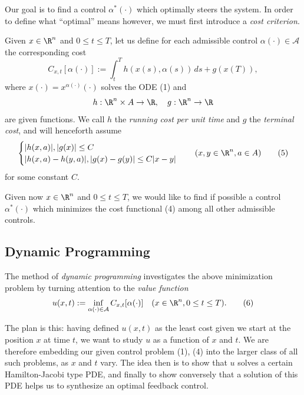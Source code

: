 Our goal is to find a control $\alpha^*(\cdot)$ which optimally steers the system. In order to define what ``optimal'' means however, we must first introduce a \textit{cost criterion}.

\begin{definition}
\label{def:control-cost-functional}
Given $x \in \R^n$ and $0 \le t \le T$, let us define for each admissible control $\alpha(\cdot) \in \mathcal{A}$ the corresponding cost
\[
C_{x,t}[\alpha(\cdot)] := \int_t^T h(x(s), \alpha(s)) \, ds + g(x(T)),
\tag{4}
\]
where $x(\cdot) = x^{\alpha(\cdot)}(\cdot)$ solves the ODE (1) and
\[
h : \R^n \times A \to \R, \quad g : \R^n \to \R
\]
are given functions. We call $h$ the \textit{running cost per unit time} and $g$ the \textit{terminal cost}, and will henceforth assume
\[
\begin{cases} |h(x, a)|, |g(x)| \le C \\ |h(x, a) - h(y, a)|, |g(x) - g(y)| \le C|x - y| \end{cases} \quad (x, y \in \R^n, a \in A)
\tag{5}
\]
for some constant $C$.

Given now $x \in \R^n$ and $0 \le t \le T$, we would like to find if possible a control $\alpha^*(\cdot)$ which minimizes the cost functional (4) among all other admissible controls.
\end{definition}

\subsection{Dynamic Programming}

\begin{definition}
\label{def:value-function}
The method of \textit{dynamic programming} investigates the above minimization problem by turning attention to the \textit{value function}
\[
u(x,t) := \inf_{\alpha(\cdot) \in \mathcal{A}} C_{x,t}[\alpha(\cdot)] \quad (x \in \R^n, 0 \le t \le T).
\tag{6}
\]
\end{definition}

The plan is this: having defined $u(x,t)$ as the least cost given we start at the position $x$ at time $t$, we want to study $u$ as a function of $x$ and $t$. We are therefore embedding our given control problem (1), (4) into the larger class of all such problems, as $x$ and $t$ vary. The idea then is to show that $u$ solves a certain Hamilton-Jacobi type PDE, and finally to show conversely that a solution of this PDE helps us to synthesize an optimal feedback control.

